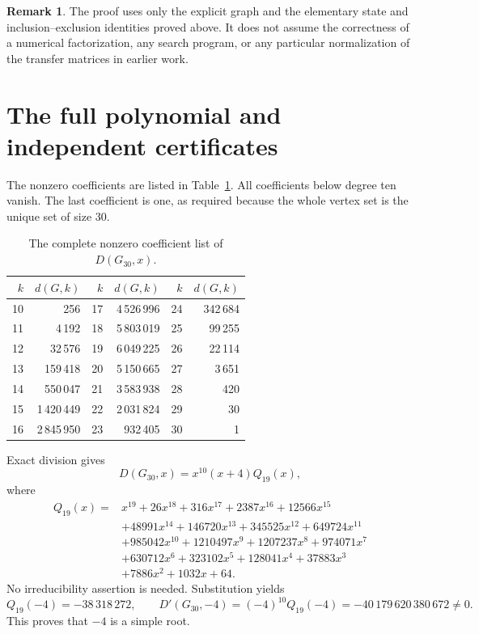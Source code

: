 \documentclass[11pt]{article}
\numberwithin{equation}{section}
\theoremstyle{definition}
\newtheorem{remark}[theorem]{Remark}
\newcommand{\D}{D}
\newcommand{\Gthirty}{G_{30}}
\begin{document}
\begin{remark}
The proof uses only the explicit graph and the elementary state and
inclusion--exclusion identities proved above. It does not assume the
correctness of a numerical factorization, any search program, or any
particular normalization of the transfer matrices in earlier work.
\end{remark}

\section{The full polynomial and independent certificates}\label{sec:polynomial}

The nonzero coefficients are listed in Table~\ref{tab:coeff}.
All coefficients below degree ten vanish. The last coefficient is one,
as required because the whole vertex set is the unique set of size 30.

\begin{table}[htbp]
\centering
\begin{tabular}{rrrrrr}
\toprule
\(k\)&\(d(G,k)\)&\(k\)&\(d(G,k)\)&\(k\)&\(d(G,k)\)\\
\midrule
10&256&17&4\,526\,996&24&342\,684\\
11&4\,192&18&5\,803\,019&25&99\,255\\
12&32\,576&19&6\,049\,225&26&22\,114\\
13&159\,418&20&5\,150\,665&27&3\,651\\
14&550\,047&21&3\,583\,938&28&420\\
15&1\,420\,449&22&2\,031\,824&29&30\\
16&2\,845\,950&23&932\,405&30&1\\
\bottomrule
\end{tabular}
\caption{The complete nonzero coefficient list of \(\D(\Gthirty,x)\).}
\label{tab:coeff}
\end{table}

Exact division gives
\begin{equation}\label{eq:factor}
 \D(\Gthirty,x)=x^{10}(x+4)Q_{19}(x),
\end{equation}
where
\begin{equation}\label{eq:quotient}
\begin{aligned}
Q_{19}(x)={}&x^{19}+26x^{18}+316x^{17}+2387x^{16}+12566x^{15}\\
 &+48991x^{14}+146720x^{13}+345525x^{12}+649724x^{11}\\
 &+985042x^{10}+1210497x^9+1207237x^8+974071x^7\\
 &+630712x^6+323102x^5+128041x^4+37883x^3\\
 &+7886x^2+1032x+64.
\end{aligned}
\end{equation}
No irreducibility assertion is needed. Substitution yields
\begin{equation}\label{eq:simple}
 Q_{19}(-4)=-38\,318\,272,\qquad
 \D'(\Gthirty,-4)=(-4)^{10}Q_{19}(-4)
 =-40\,179\,620\,380\,672\ne0.
\end{equation}
This proves that \(-4\) is a simple root.
\end{document}

